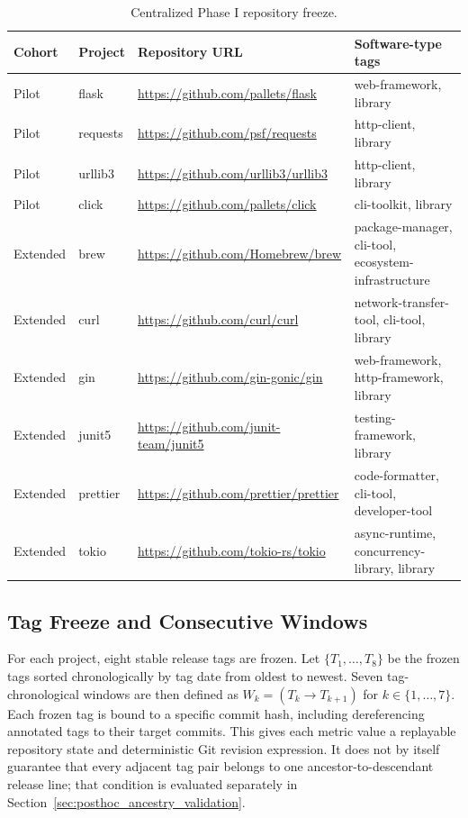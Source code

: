 \begin{table}[H]
\centering
\scriptsize
\renewcommand{\arraystretch}{1.12}
\begin{tabularx}{\textwidth}{p{1.25cm}p{1.45cm}X p{3.2cm}}
\toprule
\textbf{Cohort} & \textbf{Project} & \textbf{Repository URL} & \textbf{Software-type tags} \\
\midrule
Pilot & flask    & \url{https://github.com/pallets/flask}     & web-framework, library \\
Pilot & requests & \url{https://github.com/psf/requests}      & http-client, library \\
Pilot & urllib3  & \url{https://github.com/urllib3/urllib3}   & http-client, library \\
Pilot & click    & \url{https://github.com/pallets/click}     & cli-toolkit, library \\
Extended & brew     & \url{https://github.com/Homebrew/brew}     & package-manager, cli-tool, ecosystem-infrastructure \\
Extended & curl     & \url{https://github.com/curl/curl}         & network-transfer-tool, cli-tool, library \\
Extended & gin      & \url{https://github.com/gin-gonic/gin}     & web-framework, http-framework, library \\
Extended & junit5   & \url{https://github.com/junit-team/junit5} & testing-framework, library \\
Extended & prettier & \url{https://github.com/prettier/prettier} & code-formatter, cli-tool, developer-tool \\
Extended & tokio    & \url{https://github.com/tokio-rs/tokio}    & async-runtime, concurrency-library, library \\
\bottomrule
\end{tabularx}
\caption{Centralized Phase I repository freeze.}
\label{tab:round1_freeze}
\end{table}

\subsection{Tag Freeze and Consecutive Windows}
\label{sec:phase1_frozen_windows}

For each project, eight stable release tags are frozen. Let $\{T_1,\dots,T_8\}$ be the
frozen tags sorted chronologically by tag date from oldest to newest. Seven tag-chronological windows are then defined as
$W_k=(T_k \rightarrow T_{k+1})$ for $k\in\{1,\dots,7\}$. Each frozen tag is bound to a
specific commit hash, including dereferencing annotated tags to their target commits. This
gives each metric value a replayable repository state and deterministic Git revision expression. It does not by itself
guarantee that every adjacent tag pair belongs to one ancestor-to-descendant release line; that condition is evaluated
separately in Section~\ref{sec:posthoc_ancestry_validation}.

